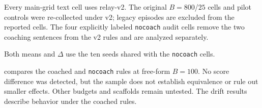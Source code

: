 Every main-grid text cell uses relay-v2. The original $B{=}800$/$25$ cells and pilot controls were re-collected under v2; legacy episodes are excluded from the reported cells. The four explicitly labeled \texttt{nocoach} audit cells remove the two coaching sentences from the v2 rules and are analyzed separately.

\begin{table}[htbp]
\centering
\small
\caption{Mean board accuracy (fraction of keys correct) with and without the two coaching sentences, using free-form notes at $B{=}100$ and ten shared seeds per model. The \texttt{nocoach} variant removes both sentences from the printed v2 rules; $\Delta$ is \texttt{nocoach} minus coached. No exact sign test confirms a score change. This is not an equivalence test; smaller effects and other interfaces remain unresolved.}
\label{tab:audit}
\begin{threeparttable}

\begin{tablenotes}[flushleft]\footnotesize
\item[] Both means and $\Delta$ use the ten seeds shared with the \texttt{nocoach} cells.
\end{tablenotes}
\end{threeparttable}
\end{table}

 compares the coached and \texttt{nocoach} rules at free-form $B{=}100$. No score difference was detected, but the sample does not establish equivalence or rule out smaller effects. Other budgets and scaffolds remain untested. The drift results describe behavior under the coached rules.
